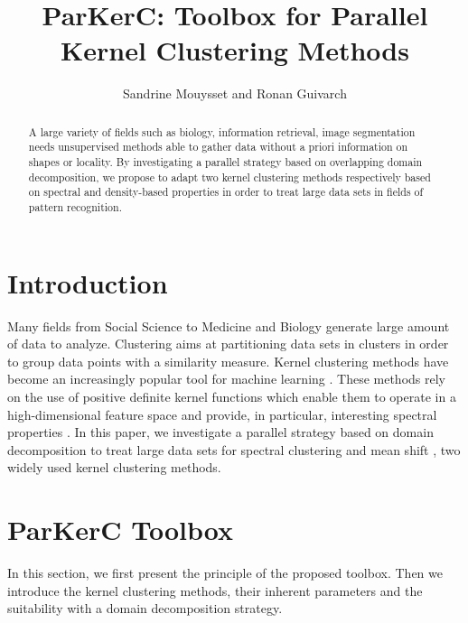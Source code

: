 \documentclass{llncs}
\begin{document}
\title{ParKerC: Toolbox for Parallel Kernel Clustering Methods}

\author{Sandrine Mouysset and Ronan Guivarch}


\maketitle

\begin{abstract}
A large variety of fields such as biology, information retrieval, image
segmentation needs unsupervised methods able to gather data without a priori
information on shapes or locality. By investigating a parallel strategy based
on overlapping domain decomposition, we propose to adapt two kernel
clustering methods respectively based on spectral and density-based properties in order to treat large data sets in fields of pattern
recognition.
\end{abstract}

\section{Introduction}

Many fields from Social Science to Medicine and Biology generate large amount
of data to analyze. Clustering aims at partitioning data sets in clusters in
order to group data points with a similarity measure.  
Kernel clustering methods have become an increasingly popular tool for machine learning \cite{hofmann2008kernel}. These methods rely on the use of positive definite kernel functions which enable them to operate in a high-dimensional feature space and provide, in particular, interesting spectral properties \cite{speC}.  In this paper, we investigate a parallel strategy based
on domain decomposition to treat large data sets for spectral clustering and mean shift \cite{Fukunaga},  two widely used kernel clustering methods.

\section{ParKerC Toolbox}

In this section, we first present the principle of the proposed toolbox. Then
we introduce the kernel clustering methods, their inherent parameters and the
suitability  with a domain decomposition strategy.
\end{document}
